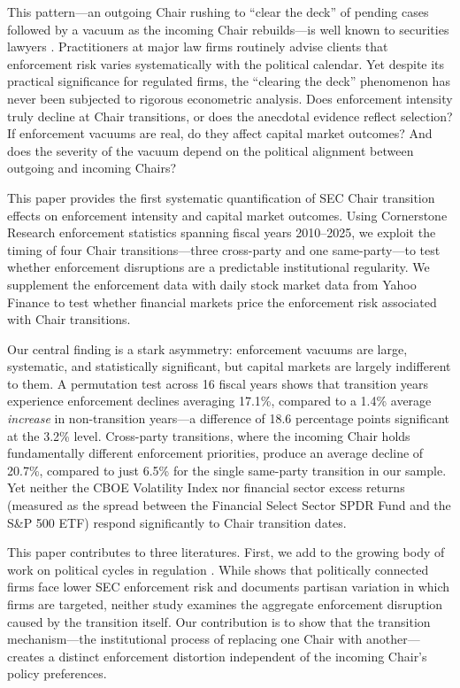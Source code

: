 \documentclass[12pt]{article}
\begin{document}
This pattern---an outgoing Chair rushing to ``clear the deck'' of pending cases followed by a vacuum as the incoming Chair rebuilds---is well known to securities lawyers \citep{jackson2007policing}. Practitioners at major law firms routinely advise clients that enforcement risk varies systematically with the political calendar. Yet despite its practical significance for regulated firms, the ``clearing the deck'' phenomenon has never been subjected to rigorous econometric analysis. Does enforcement intensity truly decline at Chair transitions, or does the anecdotal evidence reflect selection? If enforcement vacuums are real, do they affect capital market outcomes? And does the severity of the vacuum depend on the political alignment between outgoing and incoming Chairs?

This paper provides the first systematic quantification of SEC Chair transition effects on enforcement intensity and capital market outcomes. Using Cornerstone Research enforcement statistics spanning fiscal years 2010--2025, we exploit the timing of four Chair transitions---three cross-party and one same-party---to test whether enforcement disruptions are a predictable institutional regularity. We supplement the enforcement data with daily stock market data from Yahoo Finance to test whether financial markets price the enforcement risk associated with Chair transitions.

Our central finding is a stark asymmetry: enforcement vacuums are large, systematic, and statistically significant, but capital markets are largely indifferent to them. A permutation test across 16 fiscal years shows that transition years experience enforcement declines averaging 17.1\%, compared to a 1.4\% average \emph{increase} in non-transition years---a difference of 18.6 percentage points significant at the 3.2\% level. Cross-party transitions, where the incoming Chair holds fundamentally different enforcement priorities, produce an average decline of 20.7\%, compared to just 6.5\% for the single same-party transition in our sample. Yet neither the CBOE Volatility Index nor financial sector excess returns (measured as the spread between the Financial Select Sector SPDR Fund and the S\&P 500 ETF) respond significantly to Chair transition dates.

This paper contributes to three literatures. First, we add to the growing body of work on political cycles in regulation \citep{correia2014political, mehta2019regulatory}. While \citet{correia2014political} shows that politically connected firms face lower SEC enforcement risk and \citet{pandey2025partisan} documents partisan variation in which firms are targeted, neither study examines the aggregate enforcement disruption caused by the transition itself. Our contribution is to show that the transition mechanism---the institutional process of replacing one Chair with another---creates a distinct enforcement distortion independent of the incoming Chair's policy preferences.
\end{document}
